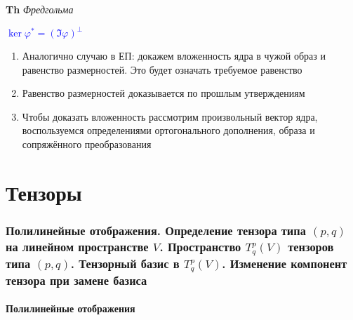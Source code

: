 \documentclass[a4paper, 14pt]{article}
\begin{document}
    \textbf{Th} \textit{Фредгольма}
    
    \textcolor{blue}{$\ker \varphi^* = (\Im \varphi)^\bot$}
    
    \begin{enumerate}
        \item Аналогично случаю в ЕП: докажем вложенность ядра в чужой образ и равенство размерностей.
        Это будет означать требуемое равенство
        \item Равенство размерностей доказывается по прошлым утверждениям
        \item Чтобы доказать вложенность рассмотрим произвольный вектор ядра, воспользуемся определениями
        ортогонального дополнения, образа и сопряжённого преобразования
    \end{enumerate}
    
     \part*{Тензоры}
    
    \section{Полилинейные отображения.
    Определение тензора типа $(p,q)$ на линейном пространстве $V$.
    Пространство $T^p_q (V)$ тензоров типа $(p,q)$.
    Тензорный базис в $T^p_q (V)$.
    Изменение компонент тензора при замене базиса}
    
    \subsection{Полилинейные отображения}
\end{document}
